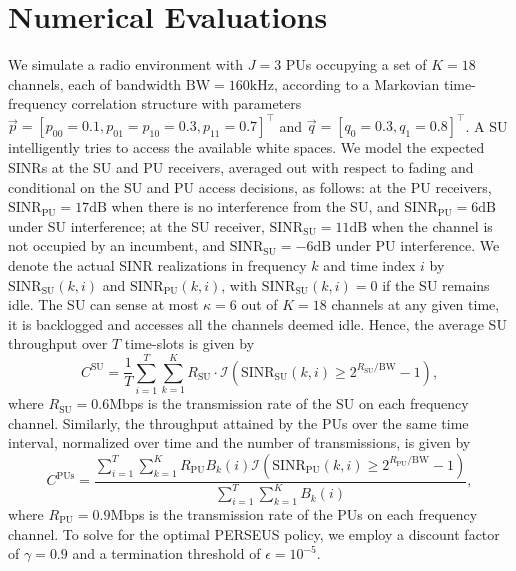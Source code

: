 \documentclass[10pt,twocolumn]{IEEEtran}
\begin{document}
\section{Numerical Evaluations}\label{IV}
We simulate a radio environment with $J{=}3$ PUs occupying a set of $K{=}18$ channels, each of bandwidth $\text{BW}{=}160 \text{kHz}$, according to a Markovian time-frequency correlation structure with parameters $\vec{p}{=}[p_{00}{=}0.1,p_{01}{=}p_{10}{=}0.3,p_{11}{=}0.7]^\intercal$ and $\vec{q}{=}[q_{0}{=}0.3,q_{1}{=}0.8]^\intercal$. A SU intelligently tries to access the available white spaces. We model the expected SINRs at the SU and PU receivers, averaged out with respect to fading and conditional on the SU and PU access decisions, as follows: 
at the PU receivers,
$\text{SINR}_{\text{PU}}{=}17\text{dB}$ when there is no interference from the SU, and $\text{SINR}_{\text{PU}}{=}6\text{dB}$ under SU interference; 
at the SU receiver,
 $\text{SINR}_{\text{SU}}{=}11\text{dB}$ when the channel is not occupied by an incumbent, and $\text{SINR}_{\text{SU}}{=}{-}6\text{dB}$ under PU interference.
  We denote 
 the actual SINR realizations in 
 frequency $k$ and time index $i$ by $\text{SINR}_{\text{SU}}(k,i)$ 
 and $\text{SINR}_{\text{PU}}(k,i)$,
 with $\text{SINR}_{\text{SU}}(k,i){=}0$ if the SU remains idle.
The SU can sense at most $\kappa{=}6$ out of $K{=}18$ channels at any given time, it is backlogged and accesses all the channels deemed idle. 
 Hence, the average SU throughput
 over $T$ time-slots is given by $$C^{\text{SU}} = \frac{1}{T}\sum_{i=1}^T \sum_{k=1}^{K} R_{\text{SU}} \cdot \mathcal{I}\left(\text{SINR}_{\text{SU}}(k,i) \geq 2^{R_{\text{SU}}/\text{BW}} - 1\right),$$ where $R_{\text{SU}}{=}0.6$Mbps is the transmission rate
   of the SU on each frequency channel. Similarly, the throughput attained by the PUs
  over the same time interval,
  normalized over time and the number of transmissions,
   is given by $$C^{\text{PUs}}{=}\frac{\sum_{i=1}^{T}\sum_{k=1}^{K}R_{\text{PU}}B_{k}(i)\mathcal{I}\left(\text{SINR}_{\text{PU}}(k,i){\geq}2^{R_{\text{PU}}/\text{BW}}{-}1\right)}{\sum_{i=1}^T\sum_{k=1}^{K}B_{k}(i)},$$ where $R_{\text{PU}}{=}0.9$Mbps is the transmission rate of the PUs on each frequency channel. To solve for the optimal PERSEUS policy, we employ a discount factor of $\gamma{=}0.9$ and a termination threshold of $\epsilon{=}10^{-5}$.
\end{document}
